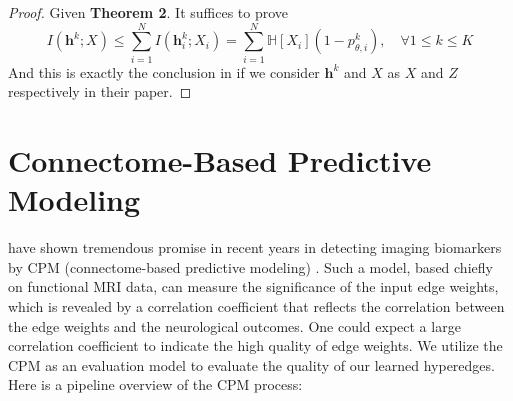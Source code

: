 \begin{proof}
Given \textbf{Theorem 2}. It suffices to prove
\begin{equation}
    I(\boldsymbol{h}^k; X) \leq \sum_{i=1}^N I(\boldsymbol{h}^k_i; X_i) = \sum_{i=1}^N \mathbb{H}[X_i] (1 - p^k_{\theta, i}),\quad \forall 1\leq k \leq K
\end{equation}
And this is exactly the conclusion in \cite{kim2021drop} if we consider $\boldsymbol{h}^k$ and $X$ as $X$ and $Z$ respectively in their paper.
\end{proof}

\section{Connectome-Based Predictive Modeling}
\label{sec:app_cpm}

\citet{shen2017using,finn2015functional} have shown tremendous promise in recent years in detecting imaging biomarkers by CPM (connectome-based predictive modeling) \citep{rosenberg2015predicting, dubois2018resting, rosenberg2020functional, rosenberg2016neuromarker}. Such a model, based chiefly on functional MRI data, can measure the significance of the input edge weights, which is revealed by a correlation coefficient that reflects the correlation between the edge weights and the neurological outcomes. One could expect a large correlation coefficient to indicate the high quality of edge weights. We utilize the CPM as an evaluation model to evaluate the quality of our learned hyperedges.
Here is a pipeline overview of the CPM process:

